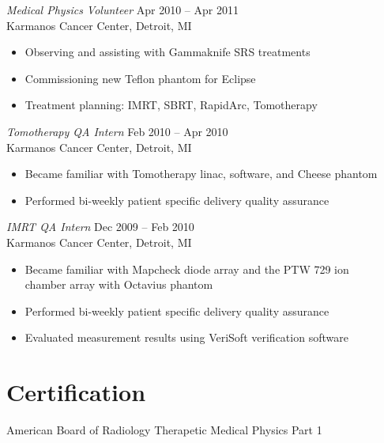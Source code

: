 \documentclass[margin]{res}
\begin{document}
\begin{resume}
{\sl Medical Physics Volunteer} \hfill Apr 2010 -- Apr 2011 \\
Karmanos Cancer Center, Detroit, MI
 \begin{itemize}  \itemsep -2pt %
    \item Observing and assisting with Gammaknife SRS treatments
    \item Commissioning new Teflon phantom for Eclipse
    \item Treatment planning: IMRT, SBRT, RapidArc, Tomotherapy
\end{itemize}

{\sl Tomotherapy QA Intern} \hfill         Feb 2010 -- Apr 2010 \\
Karmanos Cancer Center, Detroit, MI
 \begin{itemize}  \itemsep -2pt %
    \item Became familiar with Tomotherapy linac, software, and Cheese phantom
    \item Performed bi-weekly patient specific delivery quality assurance
 \end{itemize} 
{\sl IMRT QA Intern} \hfill                Dec 2009 -- Feb 2010 \\
Karmanos Cancer Center, Detroit, MI
  \begin{itemize}
    \item Became familiar with Mapcheck diode array and the PTW 729 ion \\ chamber array with Octavius phantom
    \item Performed bi-weekly patient specific delivery quality assurance
    \item Evaluated measurement results using VeriSoft verification software
   \end{itemize} 

\section{Certification} American Board of Radiology Therapetic Medical Physics Part 1


\end{resume}
\end{document}
